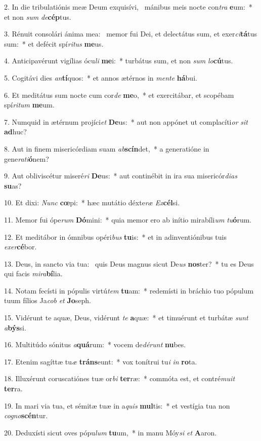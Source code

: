 2. In die tribulatiónis meæ Deum exquisívi, \dag\  mánibus meis nocte con\textit{tra} \textbf{e}um:~*  et non \textit{sum} \textit{de}\textbf{cép}tus.\

3. Rénuit consolári ánima mea: \dag\  memor fui Dei, et delectátus sum, et exer\textit{ci}\textbf{tá}tus sum:~*  et defécit spí\textit{ri}\textit{tus} \textbf{me}us.\

4. Anticipavérunt vigílias ócu\textit{li} \textbf{me}i:~*  turbátus sum, et non \textit{sum} \textit{lo}\textbf{cú}tus.\

5. Cogitávi dies \textit{an}\textbf{tí}quos:~*  et annos ætérnos in \textit{men}\textit{te} \textbf{há}bui.\

6. Et meditátus sum nocte cum cor\textit{de} \textbf{me}o,~*  et exercitábar, et scopébam spí\textit{ri}\textit{tum} \textbf{me}um.\

7. Numquid in ætérnum projíci\textit{et} \textbf{De}us:~*  aut non appónet ut complacíti\textit{or} \textit{sit} \textbf{ad}huc?\

8. Aut in finem misericórdiam suam \textit{ab}\textbf{scín}det,~*  a generatióne in gene\textit{ra}\textit{ti}\textbf{ó}nem?\

9. Aut obliviscétur miseré\textit{ri} \textbf{De}us:~*  aut continébit in ira sua misericór\textit{di}\textit{as} \textbf{su}as?\

10. Et dixi: \textit{Nunc} \textbf{cœ}pi:~*  hæc mutátio déxte\textit{ræ} \textit{Ex}\textbf{cél}si.\

11. Memor fui ópe\textit{rum} \textbf{Dó}mini:~*  quia memor ero ab inítio mirabíli\textit{um} \textit{tu}\textbf{ó}rum.\

12. Et meditábor in ómnibus opéri\textit{bus} \textbf{tu}is:~*  et in adinventiónibus tuis \textit{ex}\textit{er}\textbf{cé}bor.\

13. Deus, in sancto via tua: \dag\  quis Deus magnus sicut De\textit{us} \textbf{nos}ter?~*  tu es Deus qui facis \textit{mi}\textit{ra}\textbf{bí}lia.\

14. Notam fecísti in pópulis virtú\textit{tem} \textbf{tu}am:~*  redemísti in bráchio tuo pópulum tuum fílios Ja\textit{cob} \textit{et} \textbf{Jo}seph.\

15. Vidérunt te aquæ, Deus, vidérunt \textit{te} \textbf{a}quæ:~*  et timuérunt et turbátæ \textit{sunt} \textit{a}\textbf{býs}si.\

16. Multitúdo sónitus \textit{a}\textbf{quá}rum:~*  vocem de\textit{dé}\textit{runt} \textbf{nu}bes.\

17. Etenim sagíttæ tu\textit{æ} \textbf{tráns}eunt:~*  vox tonítrui tu\textit{i} \textit{in} \textbf{ro}ta.\

18. Illuxérunt coruscatiónes tuæ or\textit{bi} \textbf{ter}ræ:~*  commóta est, et contré\textit{mu}\textit{it} \textbf{ter}ra.\

19. In mari via tua, et sémitæ tuæ in a\textit{quis} \textbf{mul}tis:~*  et vestígia tua non \textit{co}\textit{gno}\textbf{scén}tur.\

20. Deduxísti sicut oves pópu\textit{lum} \textbf{tu}um,~*  in manu Móy\textit{si} \textit{et} \textbf{A}aron.\

